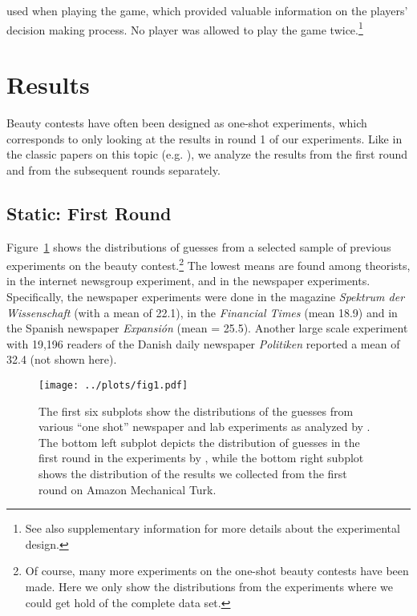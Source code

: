 \documentclass[12pt,review]{elsarticle}
\begin{document}
used when playing the game, which provided valuable information on
the players\textquoteright{} decision making process. No player was
allowed to play the game twice.\footnote{See also supplementary information for more details about the experimental
design.}

\section{Results\label{sec:Results}}
\noindent
Beauty contests have often been designed as one-shot experiments,
which corresponds to only looking at the results in round 1 of our
experiments. Like in the classic papers on this topic (e.g. \citet{Nagel95, HoCamererWeigelt98}),
we analyze the results from the first round and from the subsequent
rounds separately.

\subsection{Static: First Round\label{subsec:Static:-First-Round}}
\noindent
Figure~\ref{fig:all-distributions} shows the distributions of guesses from a selected sample of previous experiments on the beauty contest.\footnote{Of course, many more experiments on the one-shot beauty contests have been made. Here we only show the distributions from the experiments where we could get hold of the complete data set.} The lowest means are found among theorists, in the internet newsgroup experiment, and in the newspaper experiments. Specifically, the newspaper experiments were done in the magazine \textit{Spektrum der Wissenschaft} \cite{selten1998zahlenwahlspiel} (with a mean of 22.1), in the \textit{Financial Times} \cite{Thaler1997competition} (mean 18.9) and in the Spanish newspaper \textit{Expansión} \cite{NagelEtAl02} (mean = 25.5). Another large scale experiment with 19,196 readers of the Danish daily newspaper \textit{Politiken} reported a mean of 32.4 \cite{schou2005gaet} (not shown here).

\begin{figure}
\texttt{[image: ../plots/fig1.pdf]}\caption{The first six subplots show the distributions of the guesses from various ``one shot'' newspaper \cite{Thaler1997competition, selten1998zahlenwahlspiel, bosch1997juego} and lab experiments as analyzed by \citet{NagelEtAl02}. The bottom left subplot depicts the distribution of guesses in the first round in the experiments by \citet{Nagel95}, while the bottom right subplot shows the distribution of the results we collected from the first round on Amazon Mechanical Turk.}
\label{fig:all-distributions}
\end{figure}
\end{document}
